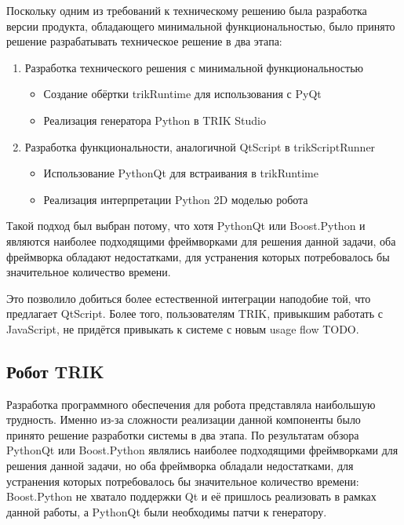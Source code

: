 \documentclass[14pt]{matmex-diploma-custom}
\begin{document}
Поскольку одним из требований к техническому решению была разработка версии продукта, обладающего минимальной функциональностью, было принято решение разрабатывать техническое решение в два этапа:
\begin{enumerate}
    \item Разработка технического решения с минимальной функциональностью
    \begin{itemize}
        \item Создание обёртки trikRuntime для использования с PyQt
        \item Реализация генератора Python в TRIK Studio
    \end{itemize}
    \item Разработка функциональности, аналогичной QtScript в trikScriptRunner
    \begin{itemize}
        \item Использование PythonQt для встраивания в trikRuntime
        \item Реализация интерпретации Python 2D моделью робота
    \end{itemize}
\end{enumerate} 

Такой подход был выбран потому, что хотя PythonQt или Boost.Python и являются наиболее подходящими фреймворками для решения данной задачи, оба фреймворка обладают недостатками, для устранения которых потребовалось бы значительное количество времени. 

Это позволило добиться более естественной интеграции наподобие той, что предлагает QtScript. Более того, пользователям TRIK, привыкшим работать с JavaScript, не придётся привыкать к системе с новым usage flow TODO. 

\subsection{Робот TRIK}
Разработка программного обеспечения для робота представляла наибольшую трудность. Именно из-за сложности реализации данной компоненты было принято решение разработки системы в два этапа. По результатам обзора PythonQt или Boost.Python являлись наиболее подходящими фреймворками для решения данной задачи, но оба фреймворка обладали недостатками, для устранения которых потребовалось бы значительное количество времени: Boost.Python не хватало поддержки Qt и её пришлось реализовать в рамках данной работы, а PythonQt были необходимы патчи к генератору.   
\end{document}

